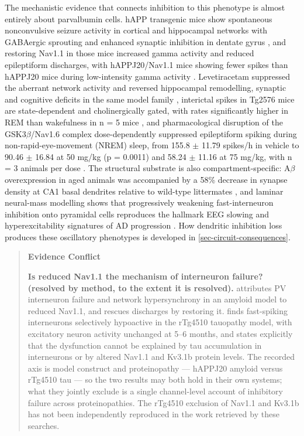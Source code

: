 \documentclass[11pt]{article}
\begin{document}
The mechanistic evidence that connects inhibition to this phenotype is almost entirely about parvalbumin cells. hAPP transgenic mice show spontaneous nonconvulsive seizure activity in cortical and hippocampal networks with GABAergic sprouting and enhanced synaptic inhibition in dentate gyrus \citep{Palop2007}, and restoring Nav1.1 in those mice increased gamma activity and reduced epileptiform discharges, with hAPPJ20/Nav1.1 mice showing fewer spikes than hAPPJ20 mice during low-intensity gamma activity \citep{Verret2012}. Levetiracetam suppressed the aberrant network activity and reversed hippocampal remodelling, synaptic and cognitive deficits in the same model family \citep{Sanchez2012}, interictal spikes in Tg2576 mice are state-dependent and cholinergically gated, with rates significantly higher in REM than wakefulness in n = 5 mice \citep{Scharfman2025}, and pharmacological disruption of the GSK3$\beta$/Nav1.6 complex dose-dependently suppressed epileptiform spiking during non-rapid-eye-movement (NREM) sleep, from 155.8 $\pm$ 11.79 spikes/h in vehicle to 90.46 $\pm$ 16.84 at 50 mg/kg (p = 0.0011) and 58.24 $\pm$ 11.16 at 75 mg/kg, with n = 3 animals per dose \citep{Baumgartner2025}. The structural substrate is also compartment-specific: A$\beta$ overexpression in aged animals was accompanied by a 58\% decrease in synapse density at CA1 basal dendrites relative to wild-type littermates \citep{Ray2024}, and laminar neural-mass modelling shows that progressively weakening fast-interneuron inhibition onto pyramidal cells reproduces the hallmark EEG slowing and hyperexcitability signatures of AD progression \citep{SanchezTodo2026}. How dendritic inhibition loss produces these oscillatory phenotypes is developed in \ref{sec-circuit-consequences}.

\begin{quote}
\noindent\textbf{Evidence Conflict}\par
\textbf{Is reduced Nav1.1 the mechanism of interneuron failure? (resolved by method, to the extent it is resolved).} \citet{Verret2012} attributes PV interneuron failure and network hypersynchrony in an amyloid model to reduced Nav1.1, and rescues discharges by restoring it. \citet{Kudo2023} finds fast-spiking interneurons selectively hypoactive in the rTg4510 tauopathy model, with excitatory neuron activity unchanged at 5--6 months, and states explicitly that the dysfunction cannot be explained by tau accumulation in interneurons or by altered Nav1.1 and Kv3.1b protein levels. The recorded axis is model construct and proteinopathy --- hAPPJ20 amyloid versus rTg4510 tau --- so the two results may both hold in their own systems; what they jointly exclude is a single channel-level account of inhibitory failure across proteinopathies. The rTg4510 exclusion of Nav1.1 and Kv3.1b has not been independently reproduced in the work retrieved by these searches.

\end{quote}
\end{document}
